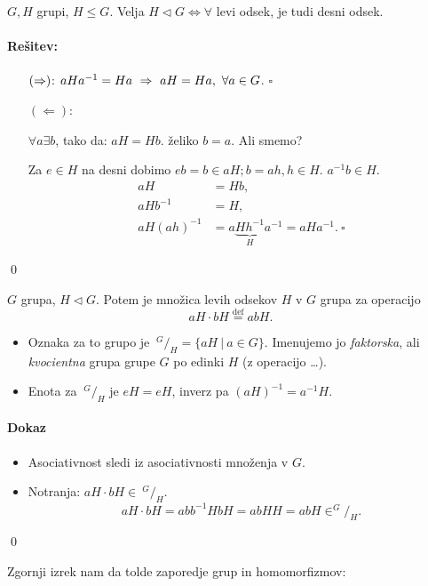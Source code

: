 \begin{zgled}
	$G, H$ grupi, $H \leq G$. Velja $H \lhd G \iff \forall$ levi odsek, je tudi desni odsek.
	\paragraph{Re\v sitev:}
	\begin{itemize}
		\item[$(\Rightarrow)$:]{$aHa^{-1} = Ha\ \Rightarrow\ aH = Ha,\ \forall a \in G$. $\square$}
		\item[$(\Leftarrow)$:]{$\forall a \exists b$, tako da: $aH = Hb$. \v zeliko $b = a$. Ali smemo?
		
		Za $e \in H$ na desni dobimo $eb = b \in aH; b = ah, h \in H$. $a^{-1}b \in H$.
		\begin{align*}
			aH &= Hb, \\
			aHb^{-1} &= H, \\
			aH (ah)^{-1} &= a\underbrace{Hh^{-1}}_{H}a^{-1} = aHa^{-1}.\ \square
		\end{align*}}
	\end{itemize}
\qed
\end{zgled}

\begin{trditev}
	$G$ grupa, $H \lhd G$. Potem je mno\v zica levih odsekov $H$ v $G$ grupa za operacijo
	\[
		aH \cdot bH \stackrel{\text{def}}{=} abH.
	\]
	\begin{itemize}
		\item{Oznaka za to grupo je $\ ^G/_H = \{aH\ |\ a\in G\}$. Imenujemo jo \emph{faktorska}, ali
			\emph{kvocientna} grupa grupe $G$ po edinki $H$ (z operacijo \ldots).}
		\item{Enota za $\ ^G/_H$ je $eH = eH$, inverz pa $(aH)^{-1} = a^{-1} H$.}
	\end{itemize}
\end{trditev}

\paragraph{Dokaz}
\begin{itemize}
	\item{Asociativnost sledi iz asociativnosti mno\v zenja v $G$.}
	\item{Notranja: $aH \cdot bH \in\ ^G/_H$.
		\[
			aH \cdot bH = abb^{-1}HbH = ab HH = ab H \in ^G/_H.
		\]}
\end{itemize}
\qed

\ni Zgornji izrek nam da tolde zaporedje grup in homomorfizmov:


